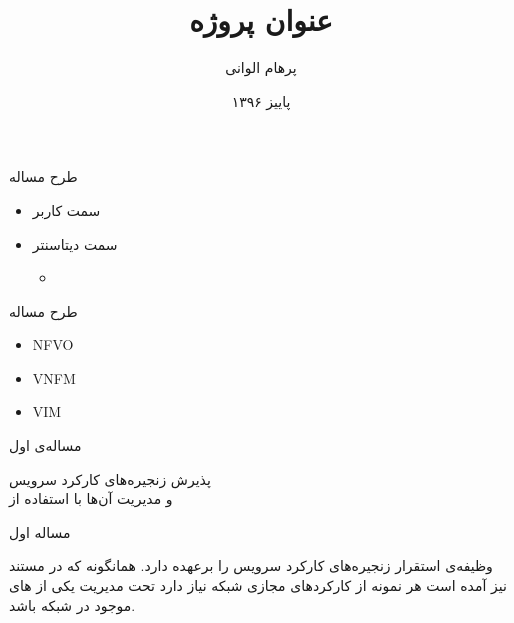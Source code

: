 \documentclass{beamer}
\title{
	عنوان پروژه
}
\subtitle{}
\author{پرهام الوانی}
\institute{دانشکده مهندسی کامپیوتر و فناوری اطلاعات}
\date{پاییز ۱۳۹۶}
\makeatletter
\newcommand{\RTList}{\raggedleft\rightskip\@totalleftmargin}
\makeatother
\begin{document}
\begin{persian}
\begin{frame}
\maketitle
\end{frame}

\everypar{\rightskip\rightmargin}
\begin{frame}{طرح مساله}
	\begin{itemize}\RTList
		\item سمت کاربر
		\item سمت دیتاسنتر
		\begin{itemize}\RTList
			\item {}
		\end{itemize}
	\end{itemize}
\end{frame}
\begin{frame}{طرح مساله}
	\begin{latin}
		\begin{itemize}
			\item NFVO
			\item VNFM
			\item VIM
		\end{itemize}
	\end{latin}
\end{frame}
\begin{frame}
	\begin{multicols}{3}
		\begin{center}	
			مساله‌ی اول
		\end{center}
	\end{multicols}
	\begin{center}	
		پذیرش زنجیره‌های کارکرد سرویس
		\\
		و مدیریت آن‌ها با استفاده از 
	\end{center}
\end{frame}
\begin{frame}{مساله اول}
	\par
	 وظیفه‌ی استقرار زنجیره‌های کارکرد سرویس را برعهده دارد.
	همانگونه که در مستند  نیز آمده است هر نمونه از کارکردهای مجازی شبکه نیاز دارد
	تحت مدیریت یکی از های موجود در شبکه باشد.
\end{frame}

\end{persian}
\end{document}
